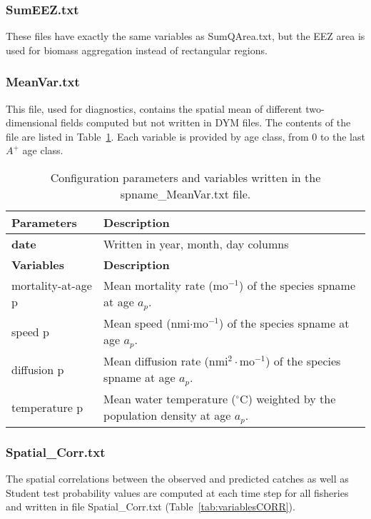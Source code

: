 \subsubsection{{\ttfamily SumEEZ.txt}}\label{sec:SumEEZ}

These files have exactly the same variables as SumQArea.txt, but the EEZ area is used for biomass aggregation instead of rectangular regions. 

\subsubsection{{\ttfamily MeanVar.txt}}
\label{sec:MeanVar}
This file, used for diagnostics, contains the spatial mean of different two-dimensional fields computed but not written in DYM files. The contents of the file are listed in Table~\ref{table:variables_MeanVar}. Each variable is provided by age class, from $0$ to the last $A^{+}$ age class.\\

\begin{center}
\begin{table}[H]
\caption{Configuration parameters and variables written in the {\ttfamily spname\_MeanVar.txt} file. }
\raggedleft
\begin{tabular}{p{4cm}p{11.75cm}}
    {\bfseries Parameters} & {\bfseries Description}\\ \hline \hline
    {\bfseries date} & Written in {\ttfamily year, month, day} columns\\ \hline
    {\bfseries Variables} & {\bfseries Description}\\ \hline \hline
    {\ttfamily mortality-at-age p}  & Mean mortality rate ({$\text{mo}^{-1}$}) of the species {\ttfamily spname} at age $a_p$. \\ \hline
    {\ttfamily speed p}  & Mean speed (nmi$\cdot\text{mo}^{-1}$) of the species {\ttfamily spname} at age $a_p$.\\ \hline
   {\ttfamily diffusion p}  &  Mean diffusion rate (nmi$^2\cdot\text{mo}^{-1}$) of the species {\ttfamily spname} at age $a_p$. \\ \hline
   {\ttfamily temperature p}  & Mean water temperature ($^\circ$C) weighted by the population density at age $a_p$. \\
    \hline
\end{tabular}
\label{table:variables_MeanVar}
\end{table}
\end{center}

\subsubsection{{\ttfamily Spatial\_Corr.txt}}
The spatial correlations between the observed and predicted catches as well as Student test probability values are computed at each time step for all fisheries and written in file {\ttfamily Spatial\_Corr.txt} (Table~\ref{tab:variablesCORR}). \\

